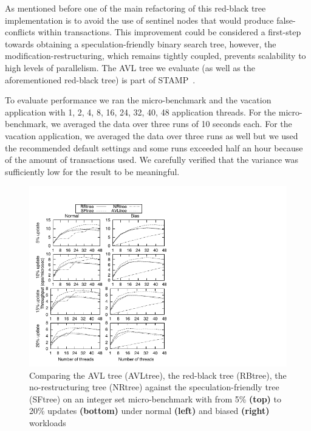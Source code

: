As mentioned before one of the main refactoring of this red-black tree implementation is to avoid the use of sentinel nodes that would 
produce false-conflicts within transactions. This improvement could be considered a first-step towards obtaining a speculation-friendly binary 
search tree, however, the modification-restructuring, which remains tightly coupled, prevents scalability to high levels of parallelism.
The AVL tree we evaluate (as well as the aforementioned red-black tree) is part of STAMP~\cite{CCKO08}. 


To evaluate performance we ran the micro-benchmark and the vacation application with 1, 2, 4, 8, 16, 24, 32, 40, 48 application threads.
For the micro-benchmark, we averaged the data over three runs of 10 seconds each. For the vacation application, we averaged the data over 
three runs as well but we used 
the recommended default settings and some runs exceeded half an hour because of the amount of transactions used. 
We carefully verified that the variance was sufficiently low for the result to be meaningful.

\begin{figure}[t]
	\begin{center}
	\includegraphics[scale=1.2,clip=true,viewport=9 0 192 228]{Tree/fig/microbench/microbench_avg_4096}
	\caption{Comparing the AVL tree (AVLtree), the red-black tree (RBtree), the no-restructuring tree (NRtree) against the speculation-friendly tree (SFtree) on an integer set micro-benchmark with from 5\% {\bf (top)} to 20\% updates {\bf (bottom)} under normal {\bf (left)} and biased {\bf (right)}  workloads\label{fig:microbench}}
	\end{center}
\end{figure}

